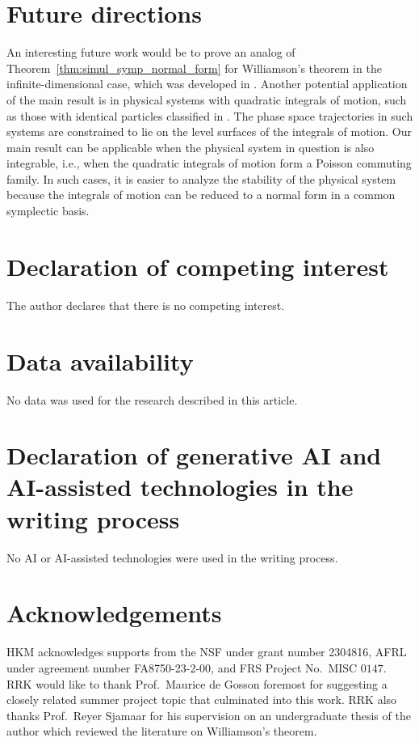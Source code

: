 \documentclass[preprint,12pt]{elsarticle}
\begin{document}
\section{Future directions}
\label{sec:future}
    An interesting future work would be to prove an analog of Theorem~\ref{thm:simul_symp_normal_form} for Williamson's theorem in the infinite-dimensional case, which was developed in \cite{bhat2019real}.
    Another potential application of the main result is in physical systems with quadratic integrals of motion, such as those with identical particles classified in \cite{Brihaye2004}. The phase space trajectories in such systems are constrained to lie on the level surfaces of the integrals of motion. Our main result can be applicable when the physical system in question is also integrable, i.e., when the quadratic integrals of motion form a Poisson commuting family.
    In such cases, it is easier to analyze the stability of the physical system because the integrals of motion can be reduced to a normal form in a common symplectic basis.
    
 
\section*{Declaration of competing interest}
The author declares that there is no competing interest.

\section*{Data availability}
No data was used for the research described in this article.

\section*{Declaration of generative AI and AI-assisted technologies in the writing process}
No AI or AI-assisted technologies were used in the writing process.

\section*{Acknowledgements}
    HKM acknowledges supports from the NSF under grant number 2304816, AFRL under agreement number FA8750-23-2-00, and FRS Project No.~MISC $0147$.
    RRK would like to thank Prof.~Maurice de Gosson foremost for suggesting a closely related summer project topic that culminated into this work.
    RRK also thanks Prof.~Reyer Sjamaar for his supervision on an undergraduate thesis of the author which reviewed the literature on Williamson's theorem.
\end{document}
